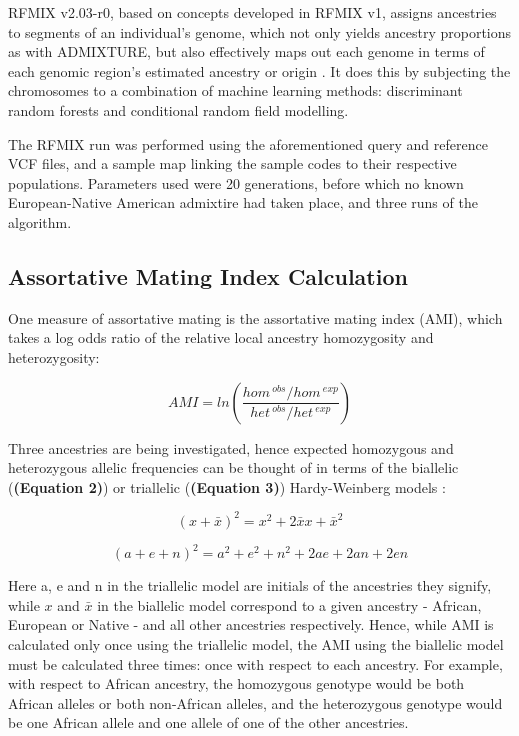 \documentclass[11pt]{article}
\begin{document}
RFMIX v2.03-r0, based on concepts developed in RFMIX v1, assigns ancestries to segments of an individual's genome, which not only yields ancestry proportions as with ADMIXTURE, but also effectively maps out each genome in terms of each genomic region's estimated ancestry or origin \parencite{Maples2013}. It does this by subjecting the chromosomes to a combination of machine learning methods: discriminant random forests and conditional random field modelling.

The RFMIX run was performed using the aforementioned query and reference VCF files, and a sample map linking the sample codes to their respective populations. Parameters used were 20 generations, before which no known European-Native American admixtire had taken place, and three runs of the algorithm.





\subsection{Assortative Mating Index Calculation}


One measure of assortative mating is the assortative mating index (AMI), which takes a log odds ratio of the relative local ancestry homozygosity and heterozygosity:


\begin{equation}
    AMI = ln{\left( \frac{ hom^{\: obs} / hom^{\: exp} }
                         { het^{\: obs} / het^{\: exp} } \right)}
\end{equation}
\vspace{3mm}


Three ancestries are being investigated, hence expected homozygous and heterozygous allelic frequencies can be thought of in terms of the biallelic (\textbf{(Equation 2)}) or triallelic (\textbf{(Equation 3)}) Hardy-Weinberg models \parencite{Norris2019}: 

\begin{equation}
    (x + \bar{x})^{2} = x^{2} + 2\bar{x}x + \bar{x}^{2}
\end{equation}


\begin{equation}
    (a + e + n)^{2} = a^{2} + e^{2} + n^{2} + 2ae + 2an + 2en
\end{equation}
\vspace{3mm}


Here a, e and n in the triallelic model are initials of the ancestries they signify, while $x$ and $\bar{x}$ in the biallelic model correspond to a given ancestry - African, European or Native - and all other ancestries respectively. Hence, while AMI is calculated only once using the triallelic model, the AMI using the biallelic model must be calculated three times: once with respect to each ancestry. For example, with respect to African ancestry, the homozygous genotype would be both African alleles or both non-African alleles, and the heterozygous genotype would be one African allele and one allele of one of the other ancestries.
\end{document}
